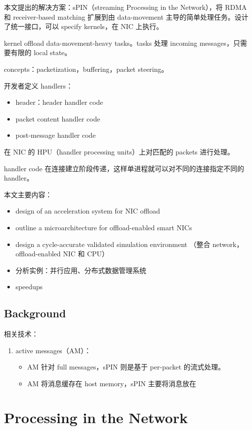 \documentclass[cn,pad,11pt,green,geye]{../elegantnote}
\begin{document}
本文提出的解决方案：sPIN（streaming Processing in the Network），将 RDMA 和 receiver-based matching 扩展到由 data-movement 主导的简单处理任务。设计了统一接口，可以 specify kernels，在 NIC 上执行。

kernel offload data-movement-heavy tasks。tasks 处理 incoming messages，只需要有限的 local state。

concepts：packetization，buffering，packet steering。

开发者定义 handlers：
\begin{itemize}
   \item header：header handler code
   \item packet content handler code
   \item post-message handler code
\end{itemize}

在 NIC 的 HPU（handler processing units）上对匹配的 packets 进行处理。

handler code 在连接建立阶段传递，这样单进程就可以对不同的连接指定不同的 handler。

本文主要内容：
\begin{itemize}
   \item design of an acceleration system for NIC offload
   \item outline a microarchitecture for offload-enabled smart NICs
   \item design a cycle-accurate validated simulation environment （整合 network，offload-enabled NIC 和 CPU）
   \item 分析实例：并行应用、分布式数据管理系统
   \item speedups
\end{itemize}

\subsection{Background}
相关技术：

\begin{enumerate}
   \item active messages（AM）：
      \begin{itemize}
         \item AM 针对 full messages，sPIN 则是基于 per-packet 的流式处理。
         \item AM 将消息缓存在 host memory，sPIN 主要将消息放在
      \end{itemize}
\end{enumerate}

\section{Processing in the Network}
\end{document}
